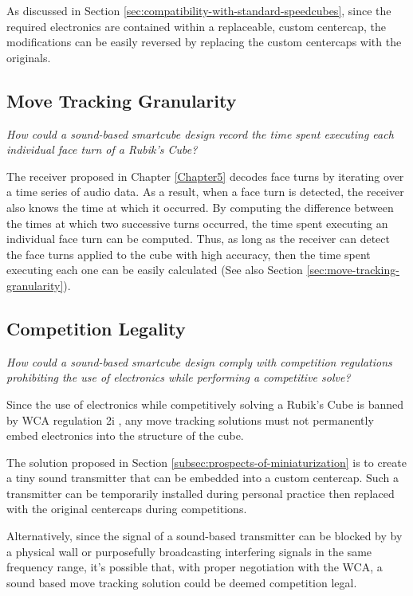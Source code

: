 As discussed in Section
\ref{sec:compatibility-with-standard-speedcubes}, since the required
electronics are contained within a replaceable, custom centercap, the
modifications can be easily reversed by replacing the custom centercaps
with the originals.


\subsection{Move Tracking Granularity}
\label{subsec:answer-granularity}

\emph{How could a sound-based smartcube design record the time spent
executing each individual face turn of a Rubik's Cube?}

The receiver proposed in Chapter \ref{Chapter5} decodes face turns by
iterating over a time series of audio data. As a result, when a face
turn is detected, the receiver also knows the time at which it
occurred. By computing the difference between the times at which two
successive turns occurred, the time spent executing an individual face
turn can be computed. Thus, as long as the receiver can detect the face
turns applied to the cube with high accuracy, then the time spent
executing each one can be easily calculated (See also Section
\ref{sec:move-tracking-granularity}).


\subsection{Competition Legality}
\label{subsec:answer-competition-legality}

\emph{How could a sound-based smartcube design comply with competition
regulations prohibiting the use of electronics while performing a
competitive solve?}

Since the use of electronics while competitively solving a Rubik's Cube
is banned by WCA regulation 2i \cite{wca-regulations}, any move
tracking solutions must not permanently embed electronics into the
structure of the cube.

The solution proposed in Section
\ref{subsec:prospects-of-miniaturization} is to create a tiny sound
transmitter that can be embedded into a custom centercap. Such a
transmitter can be temporarily installed during personal practice then
replaced with the original centercaps during competitions.

Alternatively, since the signal of a sound-based transmitter can be
blocked by by a physical wall or purposefully broadcasting interfering
signals in the same frequency range, it's possible that, with proper
negotiation with the WCA, a sound based move tracking solution could be
deemed competition legal.


